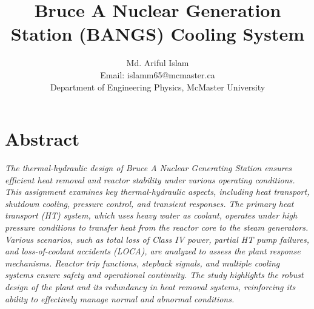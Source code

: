 \documentclass[12pt]{article}
\title{Bruce A Nuclear Generation Station (BANGS) Cooling System}
\author{Md. Ariful Islam \\ Email: islamm65@mcmaster.ca \\ Department of Engineering Physics, McMaster University}
\date{}
\begin{document}
\pagestyle{fancy}
\fancyhf{}                       %
\fancyhead[R]{\today}           
\renewcommand{\headrulewidth}{0.4pt} 
\fancyfoot[C]{\thepage}

\maketitle
\thispagestyle{fancy}

\section*{\centering Abstract} 

\begin{adjustwidth}{0.5in}{0.5in}

\textit{The thermal-hydraulic design of Bruce A Nuclear Generating Station ensures efficient heat removal and reactor stability under various operating conditions. This assignment examines key thermal-hydraulic aspects, including heat transport, shutdown cooling, pressure control, and transient responses. The primary heat transport (HT) system, which uses heavy water as coolant, operates under high pressure conditions to transfer heat from the reactor core to the steam generators. Various scenarios, such as total loss of Class IV power, partial HT pump failures, and loss-of-coolant accidents (LOCA), are analyzed to assess the plant response mechanisms. Reactor trip functions, stepback signals, and multiple cooling systems ensure safety and operational continuity. The study highlights the robust design of the plant and its redundancy in heat removal systems, reinforcing its ability to effectively manage normal and abnormal conditions.}
\end{adjustwidth}
\end{document}
